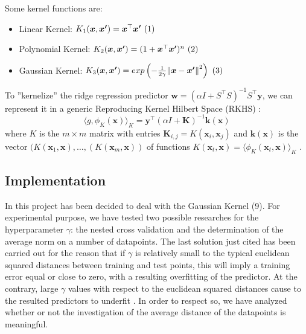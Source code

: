 \documentclass{article}
\begin{document}
Some kernel functions are:
\begin{itemize}
	\item Linear Kernel: $K_1(\boldsymbol{x},\boldsymbol{x^\prime}) = \boldsymbol{x}^\top\boldsymbol{x^\prime}\hfill
	      \stepcounter{equation}\ (\theequation)$
	\item Polynomial Kernel: $K_2(\boldsymbol{x},\boldsymbol{x^\prime}) = (1 + \boldsymbol{x}^\top\boldsymbol{x^\prime})^n\hfill \stepcounter{equation}\ (\theequation)$
	\item Gaussian Kernel: 
	      $K_3(\boldsymbol{x},\boldsymbol{x^\prime}) = exp \left(-\frac{1}{2\gamma}\norm{\boldsymbol{x}-\boldsymbol{x^\prime}}^2 \right)\hfill
	      \stepcounter{equation}\ (\theequation)$
\end{itemize}
To ''kernelize'' the ridge regression predictor $\boldsymbol{w} = (\alpha I + S^\top S)^{-1}S^\top \boldsymbol{y}$, we can represent it in a generic Reproducing Kernel Hilbert Space (RKHS) \cite{rhks}: 
\begin{equation}
	\label{KRR}\langle{g,\phi_K(\boldsymbol{x})}\rangle_K = \boldsymbol{y^\top}(\alpha I + \boldsymbol{K})^{-1} \boldsymbol{k}(\boldsymbol{x})
\end{equation} 
where $K$ is the $m \times m$ matrix with entries $\boldsymbol{K}_{i,j} = K(\boldsymbol{x}_i,\boldsymbol{x}_j)$ and $\boldsymbol{k}(\boldsymbol{x})$ is the vector $(K(\boldsymbol{x}_1, \boldsymbol{x}), \dots, (K(\boldsymbol{x}_m, \boldsymbol{x}))$ of functions $K(\boldsymbol{x}_t, \boldsymbol{x}) = \langle{\phi_K(\boldsymbol{x}_t, \boldsymbol{x})}\rangle_K$ 
\cite{profk}.

\subsection{Implementation}
\label{kernelimpl}
In this project has been decided to deal with the Gaussian Kernel (9).
For experimental purpose, we have tested two possible researches for the hyperparameter $\gamma$: the nested cross validation and the determination of the average norm on a number of datapoints. The last solution just cited has been carried out for the reason that if $\gamma$ is relatively small to the typical euclidean squared distances between training and test points, this will imply a training error equal or close to zero, with a resulting overfitting of the predictor. At the contrary, large $\gamma$ values with respect to the euclidean squared distances cause to the resulted predictors to underfit \cite{profk}. In order to respect so, we have analyzed whether or not the investigation of the average distance of the datapoints is meaningful.\newline
\end{document}
